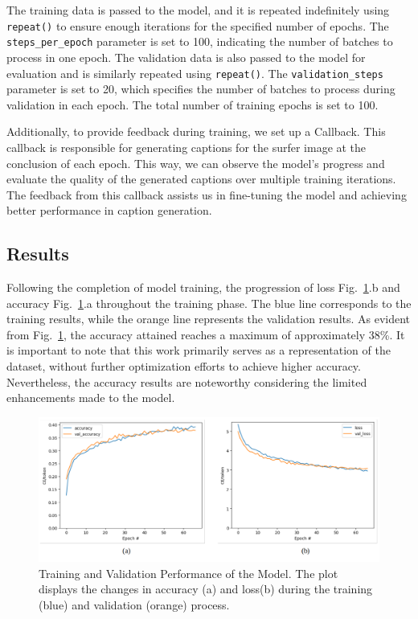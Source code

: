 \documentclass[runningheads]{llncs}
\begin{document}
The training data is passed to the model, and it is repeated indefinitely using \texttt{repeat()} to ensure enough iterations for the specified number of epochs. The \texttt{steps\_per\_epoch} parameter is set to 100, indicating the number of batches to process in one epoch. The validation data is also passed to the model for evaluation and is similarly repeated using \texttt{repeat()}. The \texttt{validation\_steps} parameter is set to 20, which specifies the number of batches to process during validation in each epoch. The total number of training epochs is set to 100. 

Additionally, to provide feedback during training, we set up a Callback. This callback is responsible for generating captions for the surfer image at the conclusion of each epoch. This way, we can observe the model's progress and evaluate the quality of the generated captions over multiple training iterations. The feedback from this callback assists us in fine-tuning the model and achieving better performance in caption generation.

\subsection{Results}

Following the completion of model training, the progression of loss Fig.~\ref{fig4}.b and accuracy  Fig.~\ref{fig4}.a throughout the training phase. The blue line corresponds to the training results, while the orange line represents the validation results.
As evident from Fig.~\ref{fig4}, the accuracy attained reaches a maximum of approximately 38\%. It is important to note that this work primarily serves as a representation of the dataset, without further optimization efforts to achieve higher accuracy. Nevertheless, the accuracy results are noteworthy considering the limited enhancements made to the model.

\begin{figure}
  \includegraphics[width=\textwidth]{loss.png}
  \caption{Training and Validation Performance of the Model. The plot displays the changes in accuracy (a) and loss(b) during the training (blue) and validation (orange) process.} \label{fig4}
\end{figure}
\end{document}
